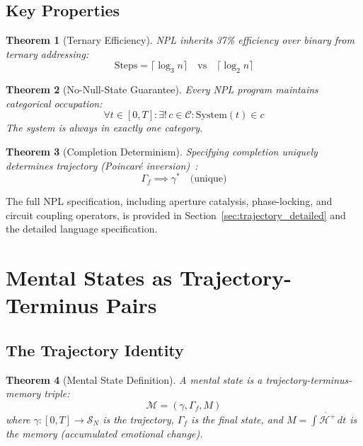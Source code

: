 \documentclass[aps,prd,twocolumn,superscriptaddress,floatfix,nofootinbib]{revtex4-2}
\newtheorem{theorem}{Theorem}[section]
\theoremstyle{remark}
\newcommand{\Sspace}{\mathcal{S}}
\newcommand{\Gstate}{\Gamma}
\newcommand{\Hfield}{\mathcal{H}^+}
\newcommand{\Mstate}{\mathcal{M}}
\begin{document}
\subsection{Key Properties}

\begin{theorem}[Ternary Efficiency]
NPL inherits 37\% efficiency over binary from ternary addressing:
\begin{equation}
\text{Steps} = \lceil \log_3 n \rceil \quad \text{vs} \quad \lceil \log_2 n \rceil
\end{equation}
\end{theorem}

\begin{theorem}[No-Null-State Guarantee]
Every NPL program maintains categorical occupation:
\begin{equation}
\forall t \in [0, T]: \exists! \, c \in \mathcal{C} : \text{System}(t) \in c
\end{equation}
The system is always in exactly one category.
\end{theorem}

\begin{theorem}[Completion Determinism]
Specifying completion uniquely determines trajectory (Poincar\'{e} inversion)~\cite{poincare1892methodes,arnold1989mathematical}:
\begin{equation}
\Gstate_f \implies \gamma^* \quad \text{(unique)}
\end{equation}
\end{theorem}

The full NPL specification, including aperture catalysis, phase-locking, and circuit coupling operators, is provided in Section~\ref{sec:trajectory_detailed} and the detailed language specification.

\section{Mental States as Trajectory-Terminus Pairs}
\label{sec:mental_states}

\subsection{The Trajectory Identity}

\begin{theorem}[Mental State Definition]
\label{thm:mental_state}
A mental state is a trajectory-terminus-memory triple:
\begin{equation}
\boxed{\Mstate = (\gamma, \Gstate_f, M)}
\end{equation}
where $\gamma: [0,T] \to \Sspace_N$ is the trajectory, $\Gstate_f$ is the final state, and $M = \int \dot{\Hfield} \, dt$ is the memory (accumulated emotional change).
\end{theorem}
\end{document}

